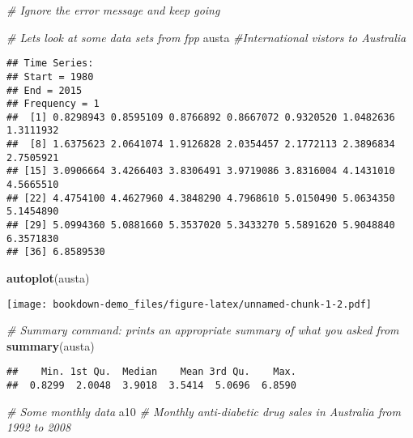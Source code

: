 \documentclass[]{book}
\newenvironment{Shaded}{\begin{snugshade}}{\end{snugshade}}
\newcommand{\CommentTok}[1]{\textcolor[rgb]{0.56,0.35,0.01}{\textit{#1}}}
\newcommand{\KeywordTok}[1]{\textcolor[rgb]{0.13,0.29,0.53}{\textbf{#1}}}
\newcommand{\NormalTok}[1]{#1}
\begin{document}
\begin{Shaded}
\begin{Highlighting}[]
\CommentTok{# Ignore the error message and keep going}



\CommentTok{# Lets look at some data sets from fpp}
\NormalTok{austa  }\CommentTok{#International vistors to Australia}
\end{Highlighting}
\end{Shaded}

\begin{verbatim}
## Time Series:
## Start = 1980 
## End = 2015 
## Frequency = 1 
##  [1] 0.8298943 0.8595109 0.8766892 0.8667072 0.9320520 1.0482636 1.3111932
##  [8] 1.6375623 2.0641074 1.9126828 2.0354457 2.1772113 2.3896834 2.7505921
## [15] 3.0906664 3.4266403 3.8306491 3.9719086 3.8316004 4.1431010 4.5665510
## [22] 4.4754100 4.4627960 4.3848290 4.7968610 5.0150490 5.0634350 5.1454890
## [29] 5.0994360 5.0881660 5.3537020 5.3433270 5.5891620 5.9048840 6.3571830
## [36] 6.8589530
\end{verbatim}

\begin{Shaded}
\begin{Highlighting}[]
\KeywordTok{autoplot}\NormalTok{(austa)}
\end{Highlighting}
\end{Shaded}

\texttt{[image: bookdown-demo\_files/figure-latex/unnamed-chunk-1-2.pdf]}

\begin{Shaded}
\begin{Highlighting}[]
\CommentTok{# Summary command: prints an appropriate summary of what you asked from}
\KeywordTok{summary}\NormalTok{(austa)}
\end{Highlighting}
\end{Shaded}

\begin{verbatim}
##    Min. 1st Qu.  Median    Mean 3rd Qu.    Max. 
##  0.8299  2.0048  3.9018  3.5414  5.0696  6.8590
\end{verbatim}

\begin{Shaded}
\begin{Highlighting}[]
\CommentTok{# Some monthly data}
\NormalTok{a10 }\CommentTok{# Monthly anti-diabetic drug sales in Australia from 1992 to 2008}
\end{Highlighting}
\end{Shaded}
\end{document}
